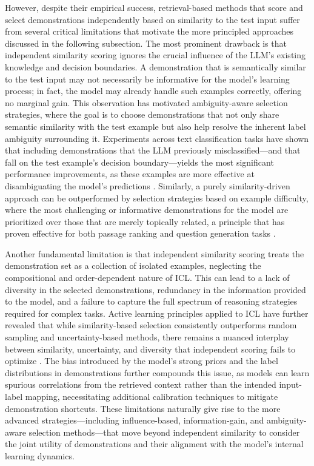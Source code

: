 \documentclass[11pt]{article}
\begin{document}
However, despite their empirical success, retrieval-based methods that score and select demonstrations independently based on similarity to the test input suffer from several critical limitations that motivate the more principled approaches discussed in the following subsection. The most prominent drawback is that independent similarity scoring ignores the crucial influence of the LLM's existing knowledge and decision boundaries. A demonstration that is semantically similar to the test input may not necessarily be informative for the model's learning process; in fact, the model may already handle such examples correctly, offering no marginal gain. This observation has motivated ambiguity-aware selection strategies, where the goal is to choose demonstrations that not only share semantic similarity with the test example but also help resolve the inherent label ambiguity surrounding it. Experiments across text classification tasks have shown that including demonstrations that the LLM previously misclassified---and that fall on the test example's decision boundary---yields the most significant performance improvements, as these examples are more effective at disambiguating the model's predictions \cite{ref36}. Similarly, a purely similarity-driven approach can be outperformed by selection strategies based on example difficulty, where the most challenging or informative demonstrations for the model are prioritized over those that are merely topically related, a principle that has proven effective for both passage ranking and question generation tasks \cite{ref128}.

Another fundamental limitation is that independent similarity scoring treats the demonstration set as a collection of isolated examples, neglecting the compositional and order-dependent nature of ICL. This can lead to a lack of diversity in the selected demonstrations, redundancy in the information provided to the model, and a failure to capture the full spectrum of reasoning strategies required for complex tasks. Active learning principles applied to ICL have further revealed that while similarity-based selection consistently outperforms random sampling and uncertainty-based methods, there remains a nuanced interplay between similarity, uncertainty, and diversity that independent scoring fails to optimize \cite{ref129}. The bias introduced by the model's strong priors and the label distributions in demonstrations further compounds this issue, as models can learn spurious correlations from the retrieved context rather than the intended input-label mapping, necessitating additional calibration techniques to mitigate demonstration shortcuts. These limitations naturally give rise to the more advanced strategies---including influence-based, information-gain, and ambiguity-aware selection methods---that move beyond independent similarity to consider the joint utility of demonstrations and their alignment with the model's internal learning dynamics.
\end{document}
